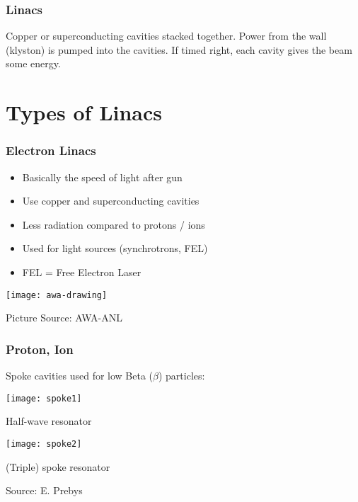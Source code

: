 \documentclass[professionalfonts,t]{beamer}
\begin{document}
\begin{frame}
\frametitle{Linacs}
Copper or superconducting cavities stacked together.
Power from the wall (klyston) is pumped into the cavities.
If timed right, each cavity gives the beam some energy.
\end{frame}

\section{Types of Linacs}
\begin{frame}[containsverbatim]
\frametitle{Electron Linacs}
\begin{itemize}
	\item Basically the speed of light after gun
	\item Use copper and superconducting cavities
	\item Less radiation compared to protons / ions
	\item Used for light sources (synchrotrons, FEL)
	\item FEL = Free Electron Laser
\end{itemize}

\texttt{[image: awa-drawing]}

\hfill Picture Source: AWA-ANL
\end{frame}


\begin{frame}
\frametitle{Proton, Ion}
Spoke cavities used for low Beta ($\beta$) particles:
\vspace{0.25em}

\centering
\begin{minipage}{0.45\textwidth}
	\centering
	\texttt{[image: spoke1]}
	
	Half-wave resonator
\end{minipage}\hspace{-1em}
\begin{minipage}{0.5\textwidth}
	\centering
	\texttt{[image: spoke2]}
	
	(Triple) spoke resonator
\end{minipage}

\vspace{1em}
\hfill Source: E. Prebys
\end{frame}


\end{document}
